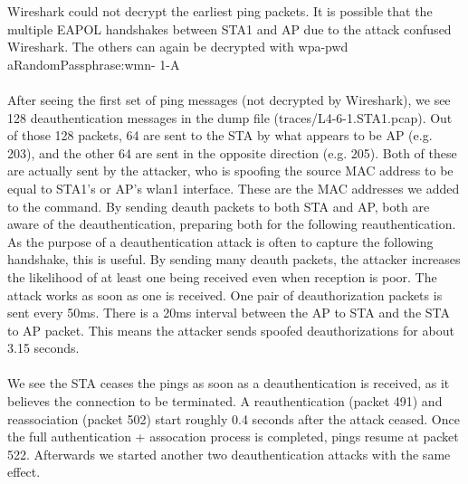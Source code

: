 Wireshark could not decrypt the earliest ping packets. It is possible that the multiple EAPOL handshakes between STA1 and AP due to the attack confused Wireshark. The others can again be decrypted with wpa-pwd aRandomPassphrase:wmn-
1-A \\ \\

After seeing the first set of ping messages (not decrypted by Wireshark), we see 128 deauthentication messages in the dump file (traces/L4-6-1.STA1.pcap).
Out of those 128 packets, 64 are sent to the STA by what appears to be AP (e.g. 203), and the other 64 are sent in the opposite direction (e.g. 205). Both of these are actually sent by the attacker, who is spoofing the source MAC address to be equal to STA1's or AP's wlan1 interface. These are the MAC addresses we added to the command. By sending deauth packets to both STA and AP, both are aware of the deauthentication, preparing both for the following reauthentication. As the purpose of a deauthentication attack is often to capture the following handshake, this is useful. By sending many deauth packets, the attacker increases the likelihood of at least one being received even when reception is poor. The attack works as soon as one is received. One pair of deauthorization packets is sent every 50ms. There is a 20ms interval between the AP to STA and the STA to AP packet. This means the attacker sends spoofed deauthorizations for about 3.15 seconds. \\ \\
%
We see the STA ceases the pings as soon as a deauthentication is received, as it believes the connection to be terminated. A reauthentication (packet 491) and reassociation (packet 502) start roughly 0.4 seconds after the attack ceased. Once the full authentication + assocation process is completed, pings resume at packet 522. Afterwards we started another two deauthentication attacks with the same effect.
%
